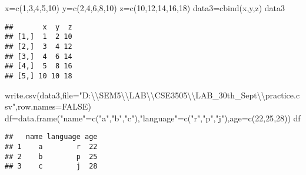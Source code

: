 \documentclass[
]{article}
\newenvironment{Shaded}{\begin{snugshade}}{\end{snugshade}}
\newcommand{\AttributeTok}[1]{\textcolor[rgb]{0.77,0.63,0.00}{#1}}
\newcommand{\ConstantTok}[1]{\textcolor[rgb]{0.00,0.00,0.00}{#1}}
\newcommand{\DecValTok}[1]{\textcolor[rgb]{0.00,0.00,0.81}{#1}}
\newcommand{\FunctionTok}[1]{\textcolor[rgb]{0.00,0.00,0.00}{#1}}
\newcommand{\NormalTok}[1]{#1}
\newcommand{\OtherTok}[1]{\textcolor[rgb]{0.56,0.35,0.01}{#1}}
\newcommand{\SpecialCharTok}[1]{\textcolor[rgb]{0.00,0.00,0.00}{#1}}
\newcommand{\StringTok}[1]{\textcolor[rgb]{0.31,0.60,0.02}{#1}}
\begin{document}
\begin{Shaded}
\begin{Highlighting}[]
\NormalTok{x}\OtherTok{=}\FunctionTok{c}\NormalTok{(}\DecValTok{1}\NormalTok{,}\DecValTok{3}\NormalTok{,}\DecValTok{4}\NormalTok{,}\DecValTok{5}\NormalTok{,}\DecValTok{10}\NormalTok{)}
\NormalTok{y}\OtherTok{=}\FunctionTok{c}\NormalTok{(}\DecValTok{2}\NormalTok{,}\DecValTok{4}\NormalTok{,}\DecValTok{6}\NormalTok{,}\DecValTok{8}\NormalTok{,}\DecValTok{10}\NormalTok{)}
\NormalTok{z}\OtherTok{=}\FunctionTok{c}\NormalTok{(}\DecValTok{10}\NormalTok{,}\DecValTok{12}\NormalTok{,}\DecValTok{14}\NormalTok{,}\DecValTok{16}\NormalTok{,}\DecValTok{18}\NormalTok{)}
\NormalTok{data3}\OtherTok{=}\FunctionTok{cbind}\NormalTok{(x,y,z)}
\NormalTok{data3}
\end{Highlighting}
\end{Shaded}

\begin{verbatim}
##       x  y  z
## [1,]  1  2 10
## [2,]  3  4 12
## [3,]  4  6 14
## [4,]  5  8 16
## [5,] 10 10 18
\end{verbatim}

\begin{Shaded}
\begin{Highlighting}[]
\FunctionTok{write.csv}\NormalTok{(data3,}\AttributeTok{file=}\StringTok{"D:}\SpecialCharTok{\textbackslash{}\textbackslash{}}\StringTok{SEM5}\SpecialCharTok{\textbackslash{}\textbackslash{}}\StringTok{LAB}\SpecialCharTok{\textbackslash{}\textbackslash{}}\StringTok{CSE3505}\SpecialCharTok{\textbackslash{}\textbackslash{}}\StringTok{LAB\_30th\_Sept}\SpecialCharTok{\textbackslash{}\textbackslash{}}\StringTok{practice.csv"}\NormalTok{,}\AttributeTok{row.names=}\ConstantTok{FALSE}\NormalTok{)}
\NormalTok{df}\OtherTok{=}\FunctionTok{data.frame}\NormalTok{(}\StringTok{"name"}\OtherTok{=}\FunctionTok{c}\NormalTok{(}\StringTok{"a"}\NormalTok{,}\StringTok{"b"}\NormalTok{,}\StringTok{"c"}\NormalTok{),}\StringTok{"language"}\OtherTok{=}\FunctionTok{c}\NormalTok{(}\StringTok{"r"}\NormalTok{,}\StringTok{"p"}\NormalTok{,}\StringTok{"j"}\NormalTok{),}\AttributeTok{age=}\FunctionTok{c}\NormalTok{(}\DecValTok{22}\NormalTok{,}\DecValTok{25}\NormalTok{,}\DecValTok{28}\NormalTok{))}
\NormalTok{df}
\end{Highlighting}
\end{Shaded}

\begin{verbatim}
##   name language age
## 1    a        r  22
## 2    b        p  25
## 3    c        j  28
\end{verbatim}
\end{document}
